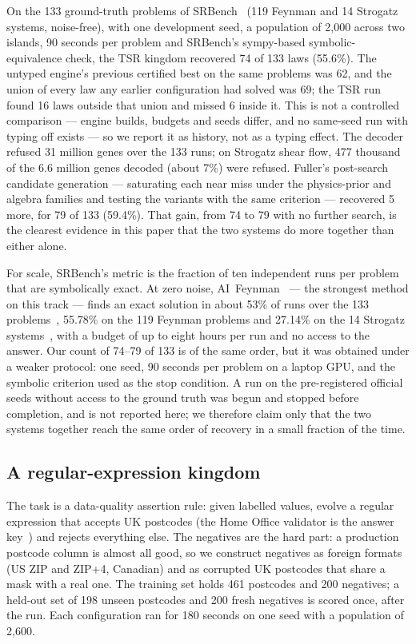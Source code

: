 \documentclass[sigconf,nonacm]{acmart}
\begin{document}
On the 133 ground-truth problems of SRBench~\cite{lacava2021srbench} (119
Feynman and 14 Strogatz systems, noise-free), with one development seed, a
population of 2{,}000 across two islands, 90 seconds per problem and SRBench's
sympy-based symbolic-equivalence check, the TSR kingdom recovered 74 of 133 laws
(55.6\%). The untyped engine's previous certified best on the same problems was
62, and the union of every law any earlier configuration had solved was 69; the
TSR run found 16 laws outside that union and missed 6 inside it. This is not a
controlled comparison --- engine builds, budgets and seeds differ, and no
same-seed run with typing off exists --- so we report it as history, not as a
typing effect. The decoder refused 31 million genes over the 133 runs; on
Strogatz shear flow, 477 thousand of the 6.6 million genes decoded (about
7\%) were refused.
Fuller's post-search candidate generation --- saturating each near miss under the
physics-prior and algebra families and testing the variants with the same
criterion --- recovered 5 more, for 79 of 133 (59.4\%). That gain, from 74 to
79 with no further search, is the clearest evidence in this paper that the two
systems do more together than either alone.

For scale, SRBench's metric is the fraction of ten independent runs per problem
that are symbolically exact. At zero noise, AI~Feynman~\cite{udrescu2020aifeynman}
--- the strongest method on this track --- finds an exact solution in about 53\%
of runs over the 133 problems~\cite{lacava2021srbench}, 55.78\% on the 119 Feynman
problems and 27.14\% on the 14 Strogatz systems~\cite{kartelj2023rilsrols}, with a
budget of up to eight hours per run and no access to the answer. Our count of
74--79 of 133 is of the same order, but it was obtained under a weaker protocol:
one seed, 90 seconds per problem on a laptop GPU, and the symbolic criterion used
as the stop condition. A run on the pre-registered official seeds without access
to the ground truth was begun and stopped before completion, and is not reported
here; we therefore claim only that the two systems together reach the same
order of recovery in a small fraction of the time.

\subsection{A regular-expression kingdom}
\label{sec:results-regex}

The task is a data-quality assertion rule: given labelled values, evolve a
regular expression that accepts UK postcodes (the Home Office validator is the
answer key~\cite{govuk2015postcode}) and rejects everything else. The negatives
are the hard part: a production postcode column is almost all good, so we
construct negatives as foreign formats (US ZIP and ZIP+4, Canadian) and as
corrupted UK postcodes that share a mask with a real one. The training set holds
461 postcodes and 200 negatives; a held-out set of 198 unseen postcodes and 200
fresh negatives is scored once, after the run. Each configuration ran for 180
seconds on one seed with a population of 2{,}600.
\end{document}
